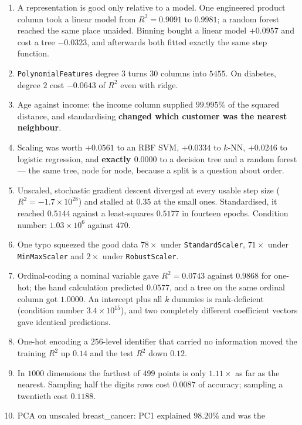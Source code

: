 \documentclass[11pt]{article}
\begin{document}
\begin{enumerate}[leftmargin=*]
  \item A representation is good only relative to a model. One engineered
    product column took a linear model from $R^2 = 0.9091$ to $0.9981$; a
    random forest reached the same place unaided. Binning bought a linear
    model $+0.0957$ and cost a tree $-0.0323$, and afterwards both fitted
    exactly the same step function.
  \item \texttt{PolynomialFeatures} degree $3$ turns $30$ columns into $5455$.
    On diabetes, degree $2$ cost $-0.0643$ of $R^2$ even with ridge.
  \item Age against income: the income column supplied $99.995\%$ of the
    squared distance, and standardising \textbf{changed which customer was the
    nearest neighbour}.
  \item Scaling was worth $+0.0561$ to an RBF SVM, $+0.0334$ to $k$-NN,
    $+0.0246$ to logistic regression, and \textbf{exactly $0.0000$} to a
    decision tree and a random forest --- the same tree, node for node,
    because a split is a question about order.
  \item Unscaled, stochastic gradient descent diverged at every usable step
    size ($R^2 = -1.7\times10^{28}$) and stalled at $0.35$ at the small ones.
    Standardised, it reached $0.5144$ against a least-squares $0.5177$ in
    fourteen epochs. Condition number: $1.03\times10^{6}$ against $470$.
  \item One typo squeezed the good data $78\times$ under
    \texttt{StandardScaler}, $71\times$ under \texttt{MinMaxScaler} and
    $2\times$ under \texttt{RobustScaler}.
  \item Ordinal-coding a nominal variable gave $R^2 = 0.0743$ against $0.9868$
    for one-hot; the hand calculation predicted $0.0577$, and a tree on the
    same ordinal column got $1.0000$. An intercept plus all $k$ dummies is
    rank-deficient (condition number $3.4\times10^{15}$), and two completely
    different coefficient vectors gave identical predictions.
  \item One-hot encoding a $256$-level identifier that carried no information
    moved the training $R^2$ up $0.14$ and the test $R^2$ down $0.12$.
  \item In $1000$ dimensions the farthest of $499$ points is only $1.11\times$
    as far as the nearest. Sampling half the digits rows cost $0.0087$ of
    accuracy; sampling a twentieth cost $0.1188$.
  \item PCA on unscaled breast\_cancer: PC1 explained $98.20\%$ and was the

\end{enumerate}
\end{document}
